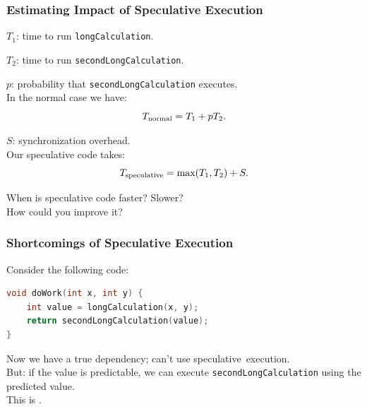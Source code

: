 \begin{frame}
  \frametitle{Estimating Impact of Speculative Execution}

  
  $T_1$: time to run {\tt longCalculation}.

  $T_2$: time to run {\tt secondLongCalculation}.

  $p$: probability that {\tt secondLongCalculation} executes.\\[1em]

  In the normal case we have:
    \[T_{\mbox{\scriptsize normal}} = T_1 + pT_2.\]

  $S$: synchronization overhead.\\
  Our speculative code takes:
    \[ T_{\mbox{\scriptsize speculative}} = \mbox{max}(T_1, T_2) + S.\]

     When is speculative code faster? Slower? \\ How could you improve it?

  
\end{frame}

\begin{frame}[fragile]
  \frametitle{Shortcomings of Speculative Execution}

  
  Consider the following code:
  
  \begin{lstlisting}[language=C]
void doWork(int x, int y) {
    int value = longCalculation(x, y);
    return secondLongCalculation(value);
}
  \end{lstlisting}

  Now we have a true dependency; can't use speculative~execution.\\[1em]

  But: if the value is predictable, we can execute
      {\tt secondLongCalculation} using the predicted value.\\[1em]

  This is .
  
\end{frame}

